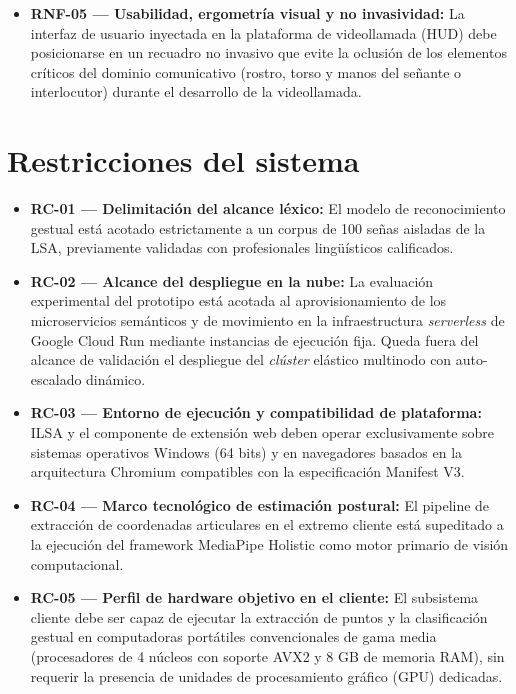 \begin{itemize}
    \item \textbf{RNF-05 --- Usabilidad, ergometría visual y no invasividad:} 
    La interfaz de usuario inyectada en la plataforma de videollamada (HUD) debe posicionarse en un recuadro no invasivo que evite la oclusión de los elementos críticos del dominio comunicativo (rostro, torso y manos del señante o interlocutor) durante el desarrollo de la videollamada.
\end{itemize}

\section{Restricciones del sistema}
\begin{itemize}
    \item \textbf{RC-01 --- Delimitación del alcance léxico:} 
    El modelo de reconocimiento gestual está acotado estrictamente a un corpus de 100 señas aisladas de la LSA, previamente validadas con profesionales lingüísticos calificados.

    \item \textbf{RC-02 --- Alcance del despliegue en la nube:} 
    La evaluación experimental del prototipo está acotada al aprovisionamiento de los microservicios semánticos y de movimiento en la infraestructura \textit{serverless} de Google Cloud Run mediante instancias de ejecución fija. Queda fuera del alcance de validación el despliegue del \textit{clúster} elástico multinodo con auto-escalado dinámico.

    \item \textbf{RC-03 --- Entorno de ejecución y compatibilidad de plataforma:} 
    ILSA y el componente de extensión web deben operar exclusivamente sobre sistemas operativos Windows (64 bits) y en navegadores basados en la arquitectura Chromium compatibles con la especificación Manifest V3.

    \item \textbf{RC-04 --- Marco tecnológico de estimación postural:} 
    El pipeline de extracción de coordenadas articulares en el extremo cliente está supeditado a la ejecución del framework MediaPipe Holistic como motor primario de visión computacional.

    \item \textbf{RC-05 --- Perfil de hardware objetivo en el cliente:} 
    El subsistema cliente debe ser capaz de ejecutar la extracción de puntos y la clasificación gestual en computadoras portátiles convencionales de gama media (procesadores de 4 núcleos con soporte AVX2 y 8 GB de memoria RAM), sin requerir la presencia de unidades de procesamiento gráfico (GPU) dedicadas. %
\end{itemize}

